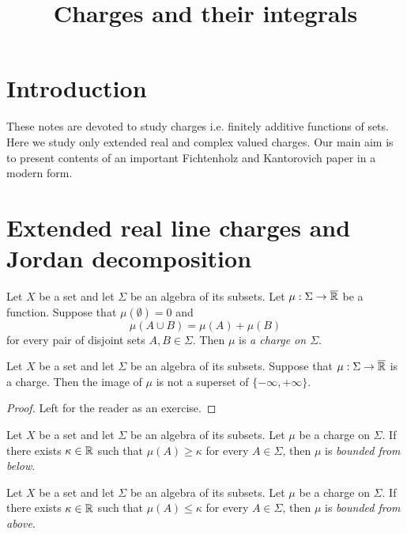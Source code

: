 



\title{Charges and their integrals}
\date{}
\maketitle

\section{Introduction}
\noindent
These notes are devoted to study charges i.e. finitely additive functions of sets. Here we study only extended real and complex valued charges. Our main aim is to present contents of an important Fichtenholz and Kantorovich paper \cite{fichtenholz1934operations} in a modern form. 

\section{Extended real line charges and Jordan decomposition}

\begin{definition}
    Let $X$ be a set and let $\Sigma$ be an algebra of its subsets. Let $\mu:\Sigma \rightarrow \overline{{\mathbb R}}$ be a function. Suppose that $\mu(\emptyset) = 0$ and
    $$\mu(A \cup B) = \mu(A) + \mu(B)$$
    for every pair of disjoint sets $A,B \in \Sigma$. Then $\mu$ is \textit{a charge on $\Sigma$}.
\end{definition}

\begin{fact}\label{fact:one_side_infinity_only_for_finitely_additive}
    Let $X$ be a set and let $\Sigma$ be an algebra of its subsets. Suppose that $\mu:\Sigma \rightarrow \overline{{\mathbb R}}$ is a charge. Then the image of $\mu$ is not a superset of $\{-\infty,+\infty\}$.
\end{fact}
\begin{proof}
    Left for the reader as an exercise.
\end{proof}

\begin{definition}
    Let $X$ be a set and let $\Sigma$ be an algebra of its subsets. Let $\mu$ be a charge on $\Sigma$. If there exists $\kappa \in {\mathbb R}$ such that $\mu(A) \geq
        \kappa$ for every $A \in \Sigma$, then $\mu$ is \textit{bounded from below}.
\end{definition}

\begin{definition}
    Let $X$ be a set and let $\Sigma$ be an algebra of its subsets. Let $\mu$ be a charge on $\Sigma$. If there exists $\kappa \in {\mathbb R}$ such that $\mu(A) \leq
        \kappa$ for every $A \in \Sigma$, then $\mu$ is \textit{bounded from above}.
\end{definition}


